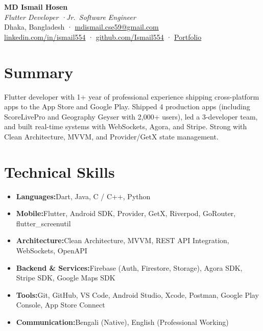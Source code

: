 \documentclass[letterpaper,10.5pt]{article}
\newcommand{\skillrow}[2]{%
  \small{\textbf{\color{dark}#1:}\quad\color{mid}#2}%
}
\begin{document}
\begin{center}
  {\Huge\bfseries\color{dark} MD Ismail Hosen} \\[6pt]
  {\large\itshape\color{light} Flutter Developer \enspace·\enspace Jr.\ Software Engineer} \\[8pt]
  \small
  {\color{accent}\faMapMarker}\enspace \color{mid}Dhaka, Bangladesh \enspace·\enspace
  \href{mailto:mdismail.cse59@gmail.com}{{\color{accent}\faEnvelope}\enspace \color{mid}mdismail.cse59@gmail.com} \\[3pt]
  \href{https://linkedin.com/in/ismail554}{{\color{accent}\faLinkedin}\enspace \color{mid}linkedin.com/in/ismail554} \enspace·\enspace
  \href{https://github.com/Ismail554}{{\color{accent}\faGithub}\enspace \color{mid}github.com/Ismail554} \enspace·\enspace
  \href{https://my-portfolio-lake-three-88.vercel.app/}{{\color{accent}\faGlobe}\enspace \color{mid}Portfolio}
\end{center}

\section{Summary}
\vspace{4pt}
\small\color{mid}
Flutter developer with 1+ year of professional experience shipping cross-platform apps to the App Store and Google Play. Shipped 4 production apps (including ScoreLivePro and Geography Geyser with 2,000+ users), led a 3-developer team, and built real-time systems with WebSockets, Agora, and Stripe. Strong with Clean Architecture, MVVM, and Provider/GetX state management.
\vspace{2pt}

\section{Technical Skills}
\vspace{6pt}
\begin{itemize}[leftmargin=0.0in, label={}, itemsep=2pt]
  \item\skillrow{Languages}{Dart, Java, C / C++, Python}
  \item\skillrow{Mobile}{Flutter, Android SDK, Provider, GetX, Riverpod, GoRouter, flutter\_screenutil}
  \item\skillrow{Architecture}{Clean Architecture, MVVM, REST API Integration, WebSockets, OpenAPI}
  \item\skillrow{Backend \& Services}{Firebase (Auth, Firestore, Storage), Agora SDK, Stripe SDK, Google Maps SDK}
  \item\skillrow{Tools}{Git, GitHub, VS Code, Android Studio, Xcode, Postman, Google Play Console, App Store Connect}
  \item\skillrow{Communication}{Bengali (Native), English (Professional Working)}
\end{itemize}
\end{document}
